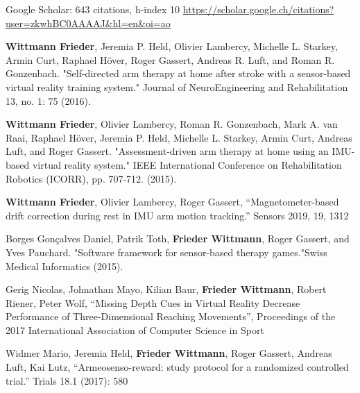 \newpage
{}



\begin{cventries}

  \cventry
    { } %
    { } %
    {} %
    {} %
    {
\begin{cvitems} %
\item {Google Scholar: 643 citations, h-index 10 \url{https://scholar.google.ch/citations?user=zkwhBC0AAAAJ&hl=en&oi=ao}}
        \item {\textbf{Wittmann Frieder}, Jeremia P. Held, Olivier Lambercy, Michelle L. Starkey, Armin Curt, Raphael Höver, Roger Gassert, Andreas R. Luft, and Roman R. Gonzenbach. "Self-directed arm therapy at home after stroke with a sensor-based virtual reality training system." Journal of NeuroEngineering and Rehabilitation 13, no. 1: 75 (2016).}
        \item{\textbf{Wittmann Frieder}, Olivier Lambercy, Roman R. Gonzenbach, Mark A. van Raai, Raphael Höver, Jeremia P. Held, Michelle L. Starkey, Armin Curt, Andreas Luft, and Roger Gassert. "Assessment-driven arm therapy at home using an IMU-based virtual reality system." IEEE International Conference on Rehabilitation Robotics (ICORR), pp. 707-712. (2015).}
\item{\textbf{Wittmann Frieder}, Olivier Lambercy, Roger Gassert, “Magnetometer-based drift correction during rest in IMU arm motion tracking.” Sensors 2019, 19, 1312}
\item{
Borges Gonçalves Daniel, Patrik Toth, \textbf{Frieder Wittmann}, Roger Gassert, and Yves Pauchard. "Software framework for sensor-based therapy games."Swiss Medical Informatics (2015).}
\item{Gerig Nicolas, Johnathan Mayo, Kilian Baur, \textbf{Frieder Wittmann}, Robert Riener, Peter Wolf, “Missing Depth Cues in Virtual Reality Decrease Performance of Three-Dimensional Reaching Movements”, Proceedings of the 2017 International Association of Computer Science in Sport}
\item{Widmer Mario, Jeremia Held, \textbf{Frieder Wittmann}, Roger Gassert, Andreas Luft, Kai Lutz, “Armeosenso-reward: study protocol for a randomized controlled trial.” Trials 18.1 (2017): 580}

\end{cvitems}}
\end{cventries}
